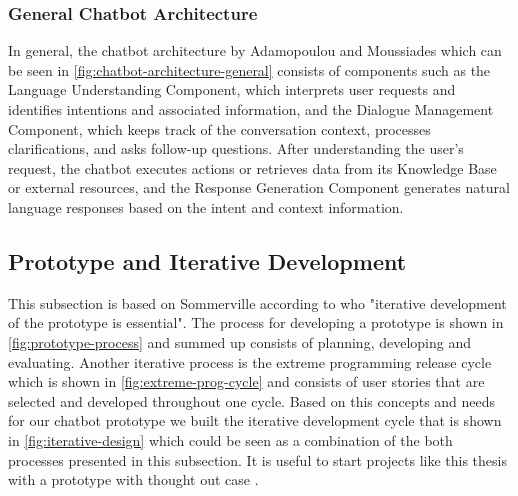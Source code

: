 \subsubsection{General Chatbot Architecture}
In general, the chatbot architecture by Adamopoulou and Moussiades\cite{adamopoulou_overview_2020} which can be seen in \cref{fig:chatbot-architecture-general} consists of components such as the Language Understanding Component, which interprets user requests and identifies intentions and associated information, and the Dialogue Management Component, which keeps track of the conversation context, processes clarifications, and asks follow-up questions. After understanding the user's request, the chatbot executes actions or retrieves data from its Knowledge Base or external resources, and the Response Generation Component generates natural language responses based on the intent and context information.

\subsection{Prototype and Iterative Development}

This subsection is based on Sommerville \cite{sommerville_software_2011} according to who "iterative development of the prototype is essential".
The process for developing a prototype is shown in \cref{fig:prototype-process} and summed up consists of planning, developing and evaluating.
Another iterative process is the extreme programming release cycle which is shown in \cref{fig:extreme-prog-cycle} and consists of user stories that are selected and developed throughout one cycle.
Based on this concepts and needs for our chatbot prototype we built the iterative development cycle that is shown in \cref{fig:iterative-design} which could be seen as a combination of the both processes presented in this subsection.
It is useful to start projects like this thesis with a prototype with thought out case \cite{lehmann_chatbot-guide_2021}.

